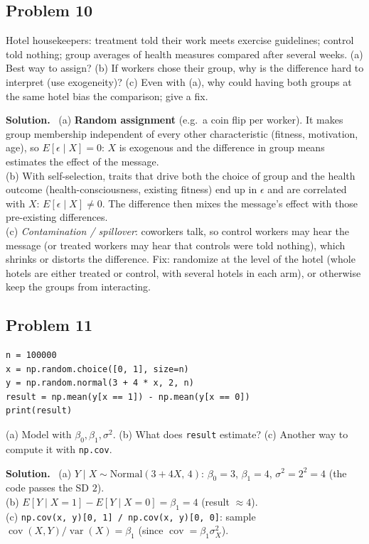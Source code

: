 \documentclass[11pt]{article}
\newcommand{\Var}{\operatorname{var}}
\newcommand{\Cov}{\operatorname{cov}}
\newcommand{\Norm}{\text{Normal}}
\newcommand{\py}[1]{\texttt{#1}}
\newenvironment{soln}{\par\smallskip\noindent\textbf{Solution.}\ }{\par\medskip}
\begin{document}
\subsection*{Problem 10}
Hotel housekeepers: treatment told their work meets exercise guidelines; control told nothing; group averages of health measures compared after several weeks.
(a) Best way to assign? (b) If workers chose their group, why is the difference hard to interpret (use exogeneity)? (c) Even with (a), why could having both groups at the same hotel bias the comparison; give a fix.
\begin{soln}
(a) \textbf{Random assignment} (e.g.\ a coin flip per worker). It makes group membership independent of every other characteristic (fitness, motivation, age), so $E[\epsilon\mid X]=0$: $X$ is exogenous and the difference in group means estimates the effect of the message.\\
(b) With self-selection, traits that drive both the choice of group and the health outcome (health-consciousness, existing fitness) end up in $\epsilon$ and are correlated with $X$: $E[\epsilon\mid X]\ne0$. The difference then mixes the message's effect with those pre-existing differences.\\
(c) \emph{Contamination / spillover}: coworkers talk, so control workers may hear the message (or treated workers may hear that controls were told nothing), which shrinks or distorts the difference. Fix: randomize at the level of the hotel (whole hotels are either treated or control, with several hotels in each arm), or otherwise keep the groups from interacting.
\end{soln}

\subsection*{Problem 11}
\begin{lstlisting}
n = 100000
x = np.random.choice([0, 1], size=n)
y = np.random.normal(3 + 4 * x, 2, n)
result = np.mean(y[x == 1]) - np.mean(y[x == 0])
print(result)
\end{lstlisting}
(a) Model with $\beta_0,\beta_1,\sigma^2$. (b) What does \py{result} estimate? (c) Another way to compute it with \py{np.cov}.
\begin{soln}
(a) $Y\mid X\sim\Norm(3+4X,\,4)$: $\beta_0=3$, $\beta_1=4$, $\sigma^2=2^2=4$ (the code passes the SD $2$).\\
(b) $E[Y\mid X{=}1]-E[Y\mid X{=}0]=\beta_1=4$ (result $\approx4$).\\
(c) \py{np.cov(x, y)[0, 1] / np.cov(x, y)[0, 0]}: sample $\Cov(X,Y)/\Var(X)=\beta_1$ (since $\Cov=\beta_1\sigma_X^2$).
\end{soln}
\end{document}
